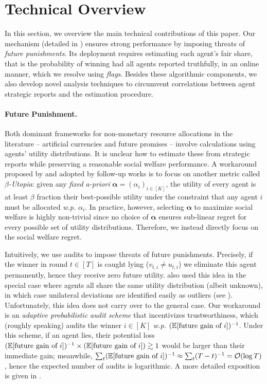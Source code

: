 \section{Technical Overview}\label{sec:technical overview}
In this section, we overview the main technical contributions of this paper.
Our mechanism \mechname (detailed in ) ensures strong performance by imposing threats of \textit{future punishments}. Its deployment requires estimating each agent's fair share, that is the probability of winning had all agents reported truthfully, in an {online} manner, which we resolve using \textit{flags}. Besides these algorithmic components, we also develop novel analysis techniques to circumvent correlations between agent strategic reports and the estimation procedure.

\paragraph{Future Punishment.}
Both dominant frameworks for non-monetary resource allocations in the literature -- artificial currencies \citep{gorokh2021monetary} and future promises \citep{balseiro2019multiagent,blanchard2024near} -- involve calculations using agents' utility distributions. It is unclear how to estimate these from strategic reports while preserving a reasonable social welfare performance.
A workaround proposed by \citet{gorokh2019remarkable} and adopted by follow-up works \citep{banerjee2023robust,fikioris2023online} is to focus on another metric called \textit{$\beta$-Utopia}: given any \textit{fixed a-priori} $\bm \alpha=(\alpha_i)_{i\in [K]}$, the utility of every agent is at least $\beta$ fraction their best-possible utility under the constraint that any agent $i$ must be allocated \textit{w.p.} $\alpha_i$. In practice, however, selecting $\bm\alpha$ to maximize social welfare is highly non-trivial since no choice of $\bm \alpha$ ensures sub-linear regret for every possible set of utility distributions.
Therefore, we instead directly focus on the social welfare regret.

Intuitively, we use audits to impose threats of future punishments. Precisely, if the winner in round $t\in[T]$ is caught lying ($v_{t,i}\neq u_{t,i}$) we eliminate this agent permanently, hence they receive zero future utility.
\citet{yin2022online} also used this idea in the special case where agents all share the same utility distribution (albeit unknown), in which case unilateral deviations are identified easily as outliers (see ).
Unfortunately, this idea does not carry over to the general case. Our workaround is an \textit{adaptive probabilistic audit scheme} that incentivizes trustworthiness, which (roughly speaking) audits the winner $i\in[K]$ \textit{w.p.} $(\E[\text{future gain of }i])^{-1}$. Under this scheme, if an agent lies, their potential loss $(\E[\text{future gain of }i])^{-1}\times (\E[\text{future gain of }i])\gtrsim 1$ would be larger than their immediate gain; meanwhile, $\sum_t (\E[\text{future gain of }i])^{-1}\approx \sum_t (T-t)^{-1}=\O(\log T)$, hence the expected number of audits is logarithmic. A more detailed exposition is given in .

